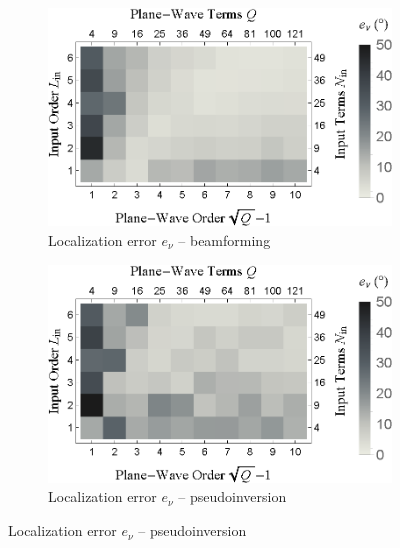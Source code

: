 \begin{figure}[t]\ContinuedFloat
	\begin{subfigure}[b]{0.49\textwidth}
        		\includegraphics[width=\textwidth]{07_characterization_extrapolation/figures/tylka2017_order_pwt-bf.eps}
        		\caption{Localization error $e_\nu$ -- beamforming}
        		\label{fig:07_Characterization_Extrapolation:Localization_Order:PWT-bf}
    	\end{subfigure}
	\hfill
    	\begin{subfigure}[b]{0.49\textwidth}
        		\includegraphics[width=\textwidth]{07_characterization_extrapolation/figures/tylka2017_order_pwt-pinv.eps}
        		\caption{Localization error $e_\nu$ -- pseudoinversion}
        		\label{fig:07_Characterization_Extrapolation:Localization_Order:PWT-pinv}
    	\end{subfigure}
	

\end{figure}
